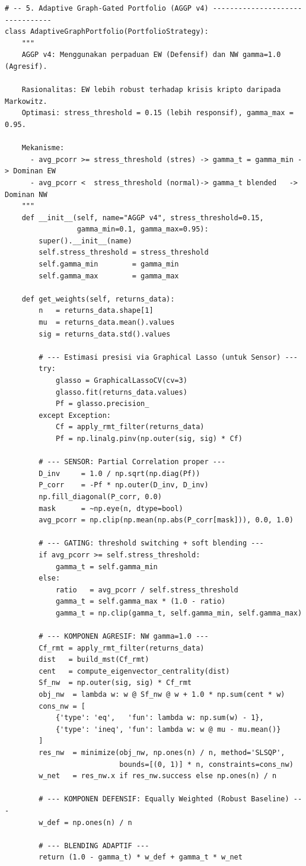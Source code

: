 \documentclass[12pt,a4paper]{article}
\begin{document}
\begin{lstlisting}[caption={Kelas-kelas strategi portofolio (AGGP v4 -- Robust Adaptive Implementation)}]
# -- 5. Adaptive Graph-Gated Portfolio (AGGP v4) --------------------------------
class AdaptiveGraphPortfolio(PortfolioStrategy):
    """
    AGGP v4: Menggunakan perpaduan EW (Defensif) dan NW gamma=1.0 (Agresif).
    
    Rasionalitas: EW lebih robust terhadap krisis kripto daripada Markowitz.
    Optimasi: stress_threshold = 0.15 (lebih responsif), gamma_max = 0.95.

    Mekanisme:
      - avg_pcorr >= stress_threshold (stres) -> gamma_t = gamma_min -> Dominan EW
      - avg_pcorr <  stress_threshold (normal)-> gamma_t blended   -> Dominan NW
    """
    def __init__(self, name="AGGP v4", stress_threshold=0.15,
                 gamma_min=0.1, gamma_max=0.95):
        super().__init__(name)
        self.stress_threshold = stress_threshold
        self.gamma_min        = gamma_min
        self.gamma_max        = gamma_max

    def get_weights(self, returns_data):
        n   = returns_data.shape[1]
        mu  = returns_data.mean().values
        sig = returns_data.std().values

        # --- Estimasi presisi via Graphical Lasso (untuk Sensor) ---
        try:
            glasso = GraphicalLassoCV(cv=3)
            glasso.fit(returns_data.values)
            Pf = glasso.precision_
        except Exception:
            Cf = apply_rmt_filter(returns_data)
            Pf = np.linalg.pinv(np.outer(sig, sig) * Cf)

        # --- SENSOR: Partial Correlation proper ---
        D_inv     = 1.0 / np.sqrt(np.diag(Pf))
        P_corr    = -Pf * np.outer(D_inv, D_inv)
        np.fill_diagonal(P_corr, 0.0)
        mask      = ~np.eye(n, dtype=bool)
        avg_pcorr = np.clip(np.mean(np.abs(P_corr[mask])), 0.0, 1.0)

        # --- GATING: threshold switching + soft blending ---
        if avg_pcorr >= self.stress_threshold:
            gamma_t = self.gamma_min
        else:
            ratio   = avg_pcorr / self.stress_threshold
            gamma_t = self.gamma_max * (1.0 - ratio)
            gamma_t = np.clip(gamma_t, self.gamma_min, self.gamma_max)

        # --- KOMPONEN AGRESIF: NW gamma=1.0 ---
        Cf_rmt = apply_rmt_filter(returns_data)
        dist   = build_mst(Cf_rmt)
        cent   = compute_eigenvector_centrality(dist)
        Sf_nw  = np.outer(sig, sig) * Cf_rmt
        obj_nw  = lambda w: w @ Sf_nw @ w + 1.0 * np.sum(cent * w)
        cons_nw = [
            {'type': 'eq',   'fun': lambda w: np.sum(w) - 1},
            {'type': 'ineq', 'fun': lambda w: w @ mu - mu.mean()}
        ]
        res_nw  = minimize(obj_nw, np.ones(n) / n, method='SLSQP',
                           bounds=[(0, 1)] * n, constraints=cons_nw)
        w_net   = res_nw.x if res_nw.success else np.ones(n) / n

        # --- KOMPONEN DEFENSIF: Equally Weighted (Robust Baseline) ---
        w_def = np.ones(n) / n

        # --- BLENDING ADAPTIF ---
        return (1.0 - gamma_t) * w_def + gamma_t * w_net
\end{lstlisting}
\end{document}
